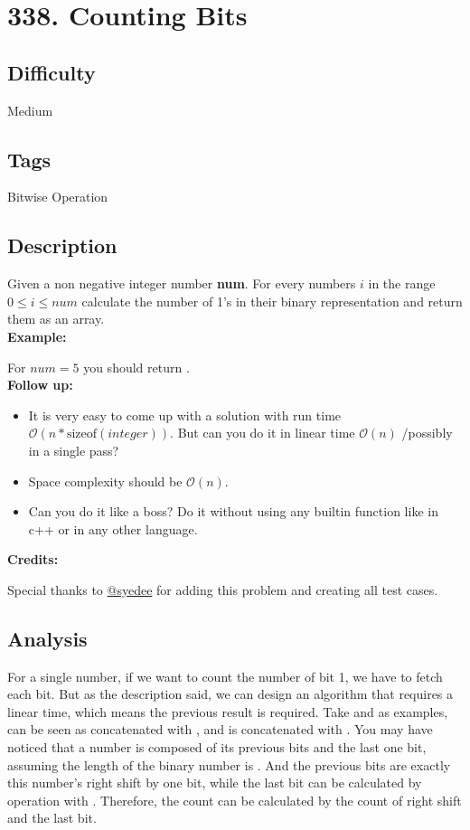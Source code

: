 \tocless\section{338. Counting Bits}
\label{algo:338}

\subsection*{Difficulty}
Medium

\subsection*{Tags}
Bitwise Operation

\subsection*{Description}
Given a non negative integer number \textbf{num}. For every numbers $i$ in the range $0 \le i \le num$ calculate the number of 1's in their binary representation and return them as an array. \\
\textbf{Example:}

For $num = 5$ you should return \inlinecode{[0, 1, 1, 2, 1, 2]}. \\
\textbf{Follow up:}
\begin{itemize}
    \item It is very easy to come up with a solution with run time $\mathcal{O}(n * \text{sizeof}(integer))$. But can you do it in linear time $\mathcal{O}(n)$ /possibly in a single pass?
    \item Space complexity should be $\mathcal{O}(n)$.
    \item Can you do it like a boss? Do it without using any builtin function like  in c++ or in any other language.
\end{itemize}
\textbf{Credits:}

Special thanks to \href{https://leetcode.com/discuss/user/syedee}{@syedee} for adding this problem and creating all test cases.

\subsection*{Analysis}
For a single number, if we want to count the number of bit 1, we have to fetch each bit. But as the description said, we can design an algorithm that requires a linear time, which means the previous result is required. Take  and  as examples,  can be seen as  concatenated with , and  is  concatenated with . You may have noticed that a number is composed of its previous  bits and the last one bit, assuming the length of the binary number is . And the previous  bits are exactly this number's right shift by one bit, while the last bit can be calculated by  operation with . Therefore, the count can be calculated by the count of right shift and the last bit.

